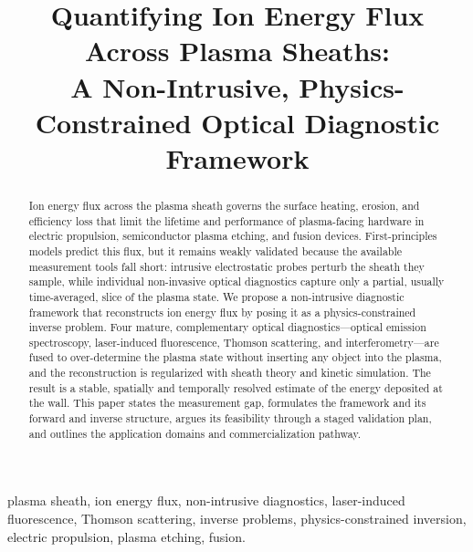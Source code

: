 \documentclass[conference]{IEEEtran}
\begin{document}
\title{Quantifying Ion Energy Flux Across Plasma Sheaths:\\ A Non-Intrusive, Physics-Constrained Optical Diagnostic Framework}

\author{
}

\maketitle

\begin{abstract}
Ion energy flux across the plasma sheath governs the surface heating, erosion, and efficiency loss that limit the lifetime and performance of plasma-facing hardware in electric propulsion, semiconductor plasma etching, and fusion devices. First-principles models predict this flux, but it remains weakly validated because the available measurement tools fall short: intrusive electrostatic probes perturb the sheath they sample, while individual non-invasive optical diagnostics capture only a partial, usually time-averaged, slice of the plasma state. We propose a non-intrusive diagnostic framework that reconstructs ion energy flux by posing it as a physics-constrained inverse problem. Four mature, complementary optical diagnostics---optical emission spectroscopy, laser-induced fluorescence, Thomson scattering, and interferometry---are fused to over-determine the plasma state without inserting any object into the plasma, and the reconstruction is regularized with sheath theory and kinetic simulation. The result is a stable, spatially and temporally resolved estimate of the energy deposited at the wall. This paper states the measurement gap, formulates the framework and its forward and inverse structure, argues its feasibility through a staged validation plan, and outlines the application domains and commercialization pathway.
\end{abstract}

\begin{IEEEkeywords}
plasma sheath, ion energy flux, non-intrusive diagnostics, laser-induced fluorescence, Thomson scattering, inverse problems, physics-constrained inversion, electric propulsion, plasma etching, fusion.
\end{IEEEkeywords}
\end{document}
